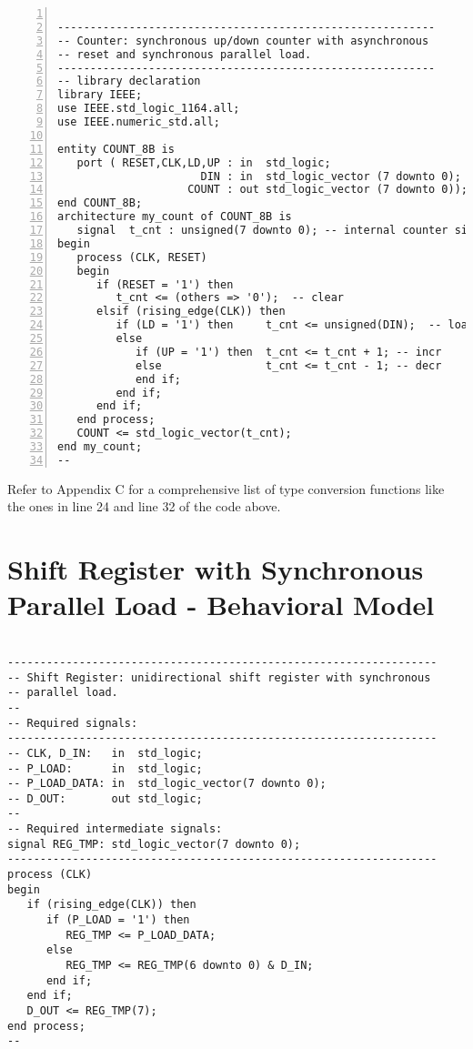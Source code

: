 \noindent
\begin{minipage}{0.99\linewidth}
\begin{lstlisting}[numbers=left]

----------------------------------------------------------
-- Counter: synchronous up/down counter with asynchronous
-- reset and synchronous parallel load.
----------------------------------------------------------
-- library declaration
library IEEE;
use IEEE.std_logic_1164.all;
use IEEE.numeric_std.all;

entity COUNT_8B is
   port ( RESET,CLK,LD,UP : in  std_logic;
                      DIN : in  std_logic_vector (7 downto 0);
                    COUNT : out std_logic_vector (7 downto 0));
end COUNT_8B;
architecture my_count of COUNT_8B is
   signal  t_cnt : unsigned(7 downto 0); -- internal counter signal
begin
   process (CLK, RESET)
   begin
      if (RESET = '1') then
         t_cnt <= (others => '0');  -- clear
      elsif (rising_edge(CLK)) then
         if (LD = '1') then     t_cnt <= unsigned(DIN);  -- load
         else
            if (UP = '1') then  t_cnt <= t_cnt + 1; -- incr
            else                t_cnt <= t_cnt - 1; -- decr
            end if;
         end if;
      end if;
   end process;
   COUNT <= std_logic_vector(t_cnt);
end my_count;
--
\end{lstlisting}
\end{minipage}

Refer to Appendix C for a comprehensive list of type conversion functions like the ones in line 24 and line 32 of the code above.

\section{Shift Register with Synchronous Parallel Load - Behavioral Model}

\noindent
\begin{minipage}{0.99\linewidth}
\begin{lstlisting}

------------------------------------------------------------------
-- Shift Register: unidirectional shift register with synchronous
-- parallel load.
--
-- Required signals:
------------------------------------------------------------------
-- CLK, D_IN:   in  std_logic;
-- P_LOAD:      in  std_logic;
-- P_LOAD_DATA: in  std_logic_vector(7 downto 0);
-- D_OUT:       out std_logic;
--
-- Required intermediate signals:
signal REG_TMP: std_logic_vector(7 downto 0);
------------------------------------------------------------------
process (CLK)
begin
   if (rising_edge(CLK)) then
      if (P_LOAD = '1') then
         REG_TMP <= P_LOAD_DATA;
      else
         REG_TMP <= REG_TMP(6 downto 0) & D_IN;
      end if;
   end if;
   D_OUT <= REG_TMP(7);
end process;
--
\end{lstlisting}
\end{minipage}

